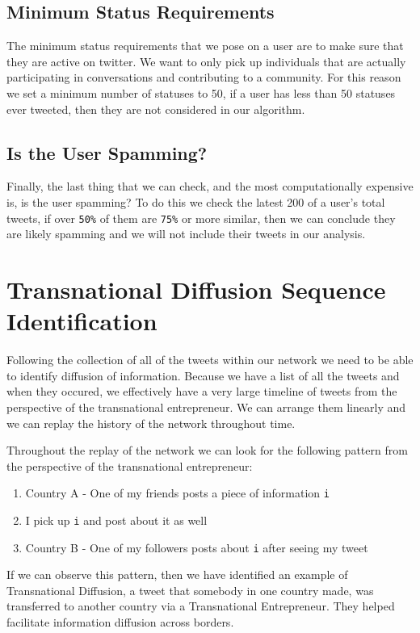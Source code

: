 \subsection{Minimum Status Requirements}
The minimum status requirements that we pose on a user are to make
sure that they are active on twitter. We want to only pick up
individuals that are actually participating in conversations and
contributing to a community. For this reason we set a minimum number
of statuses to 50, if a user has less than 50 statuses ever tweeted,
then they are not considered in our algorithm.

\subsection{Is the User Spamming?}
Finally, the last thing that we can check, and the most
computationally expensive is, is the user spamming? To do this we
check the latest 200 of a user's total tweets, if over \verb|50%| of
them are \verb|75%| or more similar, then we can conclude they are
likely spamming and we will not include their tweets in our analysis.

\section{Transnational Diffusion Sequence Identification}
Following the collection of all of the tweets within our network we
need to be able to identify diffusion of information. Because we have
a list of all the tweets and when they occured, we effectively have a
very large timeline of tweets from the perspective of the
transnational entrepreneur. We can arrange them linearly and we can
replay the history of the network throughout time.

Throughout the replay of the network we can look for the following
pattern from the perspective of the transnational entrepreneur:

\begin{enumerate}
\item Country A - One of my friends posts a piece of information \verb|i| 
\item I pick up \verb|i| and post about it as well
\item Country B - One of my followers posts about \verb|i| after seeing my tweet
\end{enumerate}

If we can observe this pattern, then we have identified an example of
Transnational Diffusion, a tweet that somebody in one country made,
was transferred to another country via a Transnational
Entrepreneur. They helped facilitate information diffusion across
borders.

